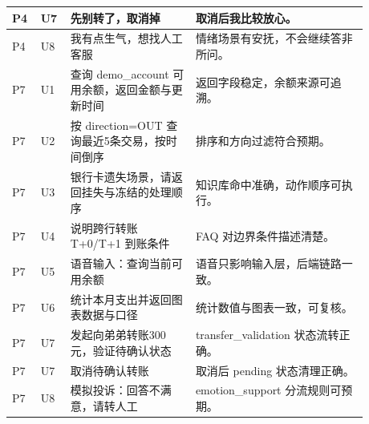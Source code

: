 \documentclass[bachelor, print]{xduthesis}
\begin{document}
\begin{appendix}
\begin{table}[H]
\begin{tabular}{|p{0.06\linewidth}|p{0.06\linewidth}|p{0.32\linewidth}|p{0.44\linewidth}|}
        \hline
        P4 & U7 & 先别转了，取消掉 & 取消后我比较放心。 \\
        \hline
        P4 & U8 & 我有点生气，想找人工客服 & 情绪场景有安抚，不会继续答非所问。 \\
        \hline
        P7 & U1 & 查询 demo\_account 可用余额，返回金额与更新时间 & 返回字段稳定，余额来源可追溯。 \\
        \hline
        P7 & U2 & 按 direction=OUT 查询最近5条交易，按时间倒序 & 排序和方向过滤符合预期。 \\
        \hline
        P7 & U3 & 银行卡遗失场景，请返回挂失与冻结的处理顺序 & 知识库命中准确，动作顺序可执行。 \\
        \hline
        P7 & U4 & 说明跨行转账 T+0/T+1 到账条件 & FAQ 对边界条件描述清楚。 \\
        \hline
        P7 & U5 & 语音输入：查询当前可用余额 & 语音只影响输入层，后端链路一致。 \\
        \hline
        P7 & U6 & 统计本月支出并返回图表数据与口径 & 统计数值与图表一致，可复核。 \\
        \hline
        P7 & U7 & 发起向弟弟转账300元，验证待确认状态 & transfer\_validation 状态流转正确。 \\
        \hline
        P7 & U7 & 取消待确认转账 & 取消后 pending 状态清理正确。 \\
        \hline
        P7 & U8 & 模拟投诉：回答不满意，请转人工 & emotion\_support 分流规则可预期。 \\
        \hline
    \end{tabular}
\end{table}

\end{appendix}
\end{document}

